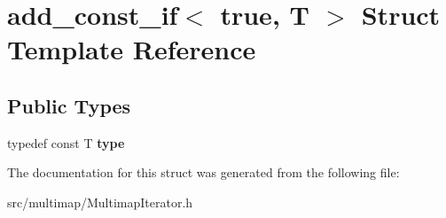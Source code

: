\hypertarget{structadd__const__if_3_01true_00_01T_01_4}{}\section{add\+\_\+const\+\_\+if$<$ true, T $>$ Struct Template Reference}
\label{structadd__const__if_3_01true_00_01T_01_4}
\subsection*{Public Types}
\begin{DoxyCompactItemize}
\item 
\mbox{\label{structadd__const__if_3_01true_00_01T_01_4_ac820eb899a0feed4f9605c6e80f8f857}} 
typedef const T {\bfseries type}
\end{DoxyCompactItemize}


The documentation for this struct was generated from the following file\+:\begin{DoxyCompactItemize}
\item 
src/multimap/Multimap\+Iterator.\+h\end{DoxyCompactItemize}
